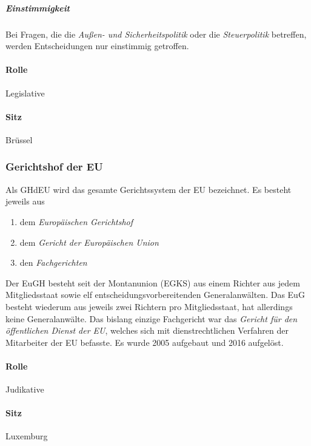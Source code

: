 \documentclass{article}
\begin{document}
	 \subparagraph{Einstimmigkeit}
	 Bei Fragen, die die \textit{Außen- und Sicherheitspolitik} oder die \textit{Steuerpolitik} betreffen, werden Entscheidungen nur einstimmig getroffen.

	\paragraph{Rolle}
	Legislative

	\paragraph{Sitz}
	Brüssel

	\subsubsection{Gerichtshof der EU}
	Als GHdEU wird das gesamte Gerichtssystem der EU bezeichnet. Es besteht jeweils aus

	\begin{enumerate}
		\item dem \textit{Europäischen Gerichtshof}
		\item dem \textit{Gericht der Europäischen Union}
		\item den \textit{Fachgerichten}
	\end{enumerate}

	Der EuGH besteht seit der Montanunion (EGKS) aus einem Richter aus jedem Mitgliedsstaat sowie elf entscheidungsvorbereitenden Generalanwälten. Das EuG  besteht wiederum aus jeweils zwei Richtern pro Mitgliedsstaat, hat allerdings keine Generalanwälte.
	Das bislang einzige Fachgericht war das \textit{Gericht für den öffentlichen Dienst der EU}, welches sich mit dienstrechtlichen Verfahren der Mitarbeiter der EU befasste. Es wurde 2005 aufgebaut und 2016 aufgelöst.

	\paragraph{Rolle}
	Judikative

	\paragraph{Sitz}
	Luxemburg
\end{document}
